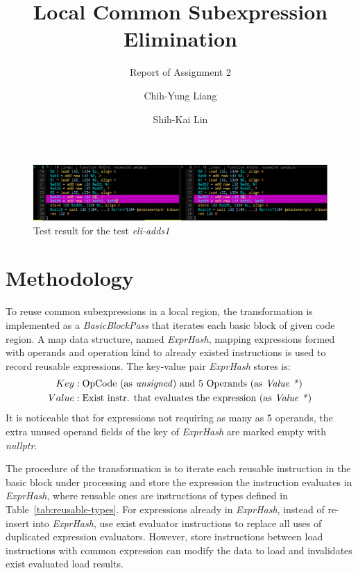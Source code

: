 \documentclass[9pt,sigconf]{acmart}
\title{Local Common Subexpression Elimination}
\subtitle{Report of Assignment 2}
\author{Chih-Yung Liang}
\affiliation{
	\department{Graduate Institute of Networking and Multimedia}
	\institution{National Taiwan University}
}
\author{Shih-Kai Lin}
\affiliation{
	\department{Dept. of Computer Science \& Information Engineering}
	\institution{National Taiwan University}
}
\begin{document}
	\maketitle
	
	\begin{figure}[bp]
		\includegraphics[width=\textwidth]{demo}
		\caption{Test result for the test \textit{eli-adds1}}
		\label{fig:test-result}
	\end{figure}
	
	\section{Methodology}
	To reuse common subexpressions in a local region, the transformation is implemented as a \textit{BasicBlockPass} that iterates each basic block of given code region. A map data structure, named \textit{ExprHash}, mapping expressions formed with operands and operation kind to already existed instructions is used to record reusable expressions. The key-value pair \textit{ExprHash} stores is:
	$$
	\begin{aligned}
	Key &: \text{OpCode (as \textit{unsigned}) and 5 Operands (as \textit{Value *})}\\
	Value &: \text{Exist instr. that evaluates the expression (as \textit{Value *})}
	\end{aligned}
	$$
	It is noticeable that for expressions not requiring as many as 5 operands, the extra unused operand fields of the key of \textit{ExprHash} are marked empty with \textit{nullptr}.
	
	The procedure of the transformation is to iterate each reusable instruction in the basic block under processing and store the expression the instruction evaluates in \textit{ExprHash}, where reusable ones are instructions of types defined in Table~\ref{tab:reusable-types}. For expressions already in \textit{ExprHash}, instead of re-insert into \textit{ExprHash}, use exist evaluator instructions to replace all uses of duplicated expression evaluators. However, store instructions between load instructions with common expression can modify the data to load and invalidates exist evaluated load results.
	
\end{document}
